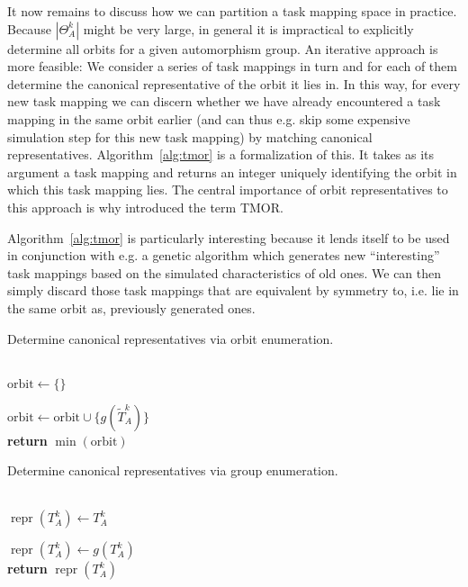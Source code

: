 It now remains to discuss how we can partition a task mapping space in
practice. Because $|\Theta_A^k|$ might be very large, in general it is
impractical to explicitly determine all orbits for a given automorphism group.
An iterative approach is more feasible: We consider a series of task mappings
in turn and for each of them determine the canonical representative of the
orbit it lies in. In this way, for every new task mapping we can discern
whether we have already encountered a task mapping in the same orbit earlier
(and can thus e.g. skip some expensive simulation step for this new task
mapping) by matching canonical representatives.  Algorithm~\ref{alg:tmor} is a
formalization of this. It takes as its argument a task mapping and returns an
integer uniquely identifying the orbit in which this task mapping lies. The
central importance of orbit representatives to this approach is why introduced
the term TMOR.

Algorithm~\ref{alg:tmor} is particularly interesting because it lends itself to
be used in conjunction with e.g. a genetic algorithm which generates new
``interesting'' task mappings based on the simulated characteristics of old
ones. We can then simply discard those task mappings that are equivalent by
symmetry to, i.e. lie in the same orbit as, previously generated ones.

\begin{algorithm}
  \caption{Determine canonical representatives via orbit enumeration.}
  \label{alg:task_repr_orbit}
  \begin{algorithmic}[1]
    \\
    \State $\mathrm{orbit} \gets \{\}$

        \State $\mathrm{orbit} \gets
                 \mathrm{orbit} \cup \{g(\widetilde{T}_A^k)\}$
      \EndFor
    \EndWhile
    \\
    \State \textbf{return} $\min(\mathrm{orbit})$
  \EndProcedure
  \end{algorithmic}
\end{algorithm}

\begin{algorithm}
  \caption{Determine canonical representatives via group enumeration.}
  \label{alg:task_repr_iterate}
  \begin{algorithmic}[1]
    \\
    \State $\operatorname{repr}(T_A^k) \gets T_A^k$

        \State $\operatorname{repr}(T_A^k) \gets g(T_A^k)$
      \EndIf
    \EndFor
    \\
    \State \textbf{return} $\operatorname{repr}(T_A^k)$
  \EndProcedure
  \end{algorithmic}
\end{algorithm}

